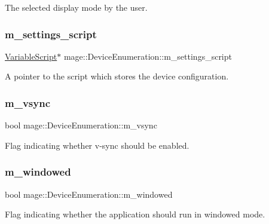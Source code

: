 The selected display mode by the user. \hypertarget{classmage_1_1_device_enumeration_a37fe23eef4ec5631831eb163a96d60f1}{}\label{classmage_1_1_device_enumeration_a37fe23eef4ec5631831eb163a96d60f1} 
\subsubsection{\texorpdfstring{m\+\_\+settings\+\_\+script}{m\_settings\_script}}
{\footnotesize\ttfamily \hyperlink{classmage_1_1_variable_script}{Variable\+Script}$\ast$ mage\+::\+Device\+Enumeration\+::m\+\_\+settings\+\_\+script\hspace{0.3cm}{\ttfamily [protected]}}

A pointer to the script which stores the device configuration. \hypertarget{classmage_1_1_device_enumeration_a027220f50649c40785e2b918411adfad}{}\label{classmage_1_1_device_enumeration_a027220f50649c40785e2b918411adfad} 
\subsubsection{\texorpdfstring{m\+\_\+vsync}{m\_vsync}}
{\footnotesize\ttfamily bool mage\+::\+Device\+Enumeration\+::m\+\_\+vsync\hspace{0.3cm}{\ttfamily [protected]}}

Flag indicating whether v-\/sync should be enabled. \hypertarget{classmage_1_1_device_enumeration_a277c5dae7861c9cb1175192a61274cc9}{}\label{classmage_1_1_device_enumeration_a277c5dae7861c9cb1175192a61274cc9} 
\subsubsection{\texorpdfstring{m\+\_\+windowed}{m\_windowed}}
{\footnotesize\ttfamily bool mage\+::\+Device\+Enumeration\+::m\+\_\+windowed\hspace{0.3cm}{\ttfamily [protected]}}

Flag indicating whether the application should run in windowed mode. 